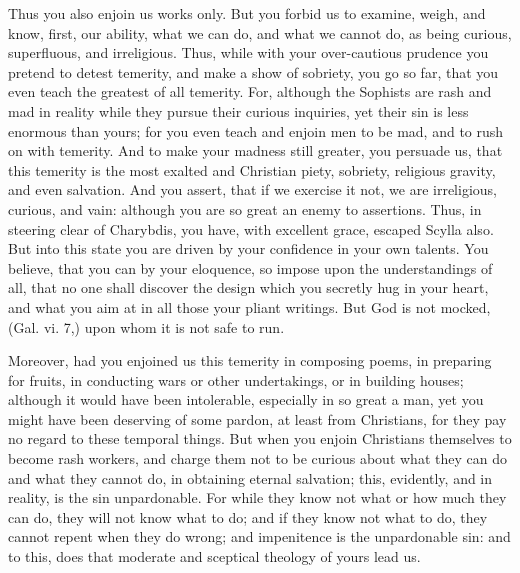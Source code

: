 Thus you also enjoin us works only. But you forbid us to examine, weigh, and know, first, our ability, what we can do, and what we cannot do, as being curious, superfluous, and irreligious. Thus, while with your over-cautious prudence you pretend to detest temerity, and make a show of sobriety, you go so far, that you even teach the greatest of all temerity. For, although the Sophists are rash and mad in reality while they pursue their curious inquiries, yet their sin is less enormous than yours; for you even teach and enjoin men to be mad, and to rush on with temerity. And to make your madness still greater, you persuade us, that this temerity is the most exalted and Christian piety, sobriety, religious gravity, and even salvation. And you assert, that if we exercise it not, we are irreligious, curious, and vain: although you are so great an enemy to assertions. Thus, in steering clear of Charybdis, you have, with excellent grace, escaped Scylla also. But into this state you are driven by your confidence in your own talents. You believe, that you can by your eloquence, so impose upon the understandings of all, that no one shall discover the design which you secretly hug in your heart, and what you aim at in all those your pliant writings. But God is not mocked, (Gal. vi. 7,) upon whom it is not safe to run.

Moreover, had you enjoined us this temerity in composing poems, in preparing for fruits, in conducting wars or other undertakings, or in building houses; although it would have been intolerable, especially in so great a man, yet you might have been deserving of some pardon, at least from Christians, for they pay no regard to these temporal things. But when you enjoin Christians themselves to become rash workers, and charge them not to be curious about what they can do and what they cannot do, in obtaining eternal salvation; this, evidently, and in reality, is the sin unpardonable. For while they know not what or how much they can do, they will not know what to do; and if they know not what to do, they cannot repent when they do wrong; and impenitence is the unpardonable sin: and to this, does that moderate and sceptical theology of yours lead us.

